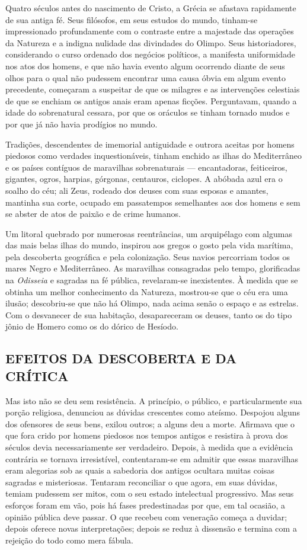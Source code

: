 \documentclass[11pt,a5paper,twoside,openany]{book}
\begin{document}
Quatro séculos antes do nascimento de Cristo, a Grécia se afastava rapidamente de sua antiga fé. Seus filósofos, em seus estudos do mundo, tinham-se impressionado profundamente com o contraste entre a majestade das operações da Natureza e a indigna nulidade das divindades do Olimpo. Seus historiadores, considerando o curso ordenado dos negócios políticos, a manifesta uniformidade nos atos dos homens, e que não havia evento algum ocorrendo diante de seus olhos para o qual não pudessem encontrar uma causa óbvia em algum evento precedente, começaram a suspeitar de que os milagres e as intervenções celestiais de que se enchiam os antigos anais eram apenas ficções. Perguntavam, quando a idade do sobrenatural cessara, por que os oráculos se tinham tornado mudos e por que já não havia prodígios no mundo.

Tradições, descendentes de imemorial antiguidade e outrora aceitas por homens piedosos como verdades inquestionáveis, tinham enchido as ilhas do Mediterrâneo e os países contíguos de maravilhas sobrenaturais — encantadoras, feiticeiros, gigantes, ogros, harpias, górgonas, centauros, ciclopes. A abóbada azul era o soalho do céu; ali Zeus, rodeado dos deuses com suas esposas e amantes, mantinha sua corte, ocupado em passatempos semelhantes aos dos homens e sem se abster de atos de paixão e de crime humanos.

Um litoral quebrado por numerosas reentrâncias, um arquipélago com algumas das mais belas ilhas do mundo, inspirou aos gregos o gosto pela vida marítima, pela descoberta geográfica e pela colonização. Seus navios percorriam todos os mares Negro e Mediterrâneo. As maravilhas consagradas pelo tempo, glorificadas na \textit{Odisseia} e sagradas na fé pública, revelaram-se inexistentes. À medida que se obtinha um melhor conhecimento da Natureza, mostrou-se que o céu era uma ilusão; descobriu-se que não há Olimpo, nada acima senão o espaço e as estrelas. Com o desvanecer de sua habitação, desapareceram os deuses, tanto os do tipo jônio de Homero como os do dórico de Hesíodo.

\subsection*{EFEITOS DA DESCOBERTA E DA CRÍTICA}
Mas isto não se deu sem resistência. A princípio, o público, e particularmente sua porção religiosa, denunciou as dúvidas crescentes como ateísmo. Despojou alguns dos ofensores de seus bens, exilou outros; a alguns deu a morte. Afirmava que o que fora crido por homens piedosos nos tempos antigos e resistira à prova dos séculos devia necessariamente ser verdadeiro. Depois, à medida que a evidência contrária se tornava irresistível, contentaram-se em admitir que essas maravilhas eram alegorias sob as quais a sabedoria dos antigos ocultara muitas coisas sagradas e misteriosas. Tentaram reconciliar o que agora, em suas dúvidas, temiam pudessem ser mitos, com o seu estado intelectual progressivo. Mas seus esforços foram em vão, pois há fases predestinadas por que, em tal ocasião, a opinião pública deve passar. O que recebeu com veneração começa a duvidar; depois oferece novas interpretações; depois se reduz à dissensão e termina com a rejeição do todo como mera fábula.
\end{document}
